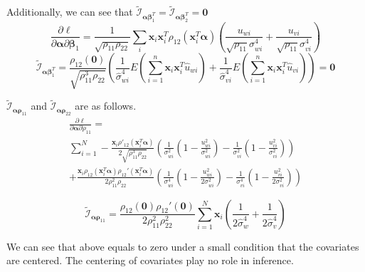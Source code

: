 \documentclass[aoas,preprint]{imsart}
\numberwithin{equation}{section}
\theoremstyle{plain}
\begin{document}
Additionally, we can see that $\tilde{\mathcal{I}}_{\bm{\alpha}{\bm{\beta}_1^T}} =  \tilde{\mathcal{I}}_{\bm{\alpha}{\bm{\beta}_2^T}} = \bm{0}$
\begin{equation}
\frac{\partial \ell}{\partial \bm{\alpha} \partial\bm{\beta}_1}= 
    \frac{1}{\sqrt{\rho_{11}\rho_{22}}} \sum_i \bm{x}_i \bm{x}_i^T \rho_{12}(\bm{x}_i^T \bm{\alpha}) \left( 
    \frac{u_{wi}}{\sqrt{\rho_{11}}\sigma_{wi}^4} + \frac{u_{vi}}{\sqrt{\rho_{11}}\sigma_{vi}^4}
    \right)
\end{equation}
$$
\tilde{\mathcal{I}}_{\bm{\alpha}{\bm{\beta}_1^T}} = 
\frac{\rho_{12}(\bm{0})}{\sqrt{\rho_{11}^3\rho_{22}}} \left(
\frac{1}{\hat{\sigma}_{wi}^4}
E\left( \sum_{i=1}^{n} \bm{x}_i \bm{x}_i^T \hat{u}_{wi}\right)
+\frac{1}{\hat{\sigma}_{vi}^4}
E\left( \sum_{i=1}^{n} \bm{x}_i \bm{x}_i^T \hat{u}_{vi} \right)
\right) = \bm{0}$$

\noindent $\tilde{\mathcal{I}}_{\bm{\alpha}\bm{\rho}_{11}}$ and $\tilde{\mathcal{I}}_{\bm{\alpha}\bm{\rho}_{22}}$ are as follows.
\begin{equation}
    \begin{multlined}
    \frac{\partial \ell}{\partial \bm{\alpha}\partial\rho_{11}} = \\
     \sum_{i=1}^{N} -\frac{\bm{x}_i \rho'_{12}(\bm{x}_i^T \bm{\alpha})}{2\sqrt{\rho_{11}^3\rho_{22}}} \left( \frac{1}{\sigma_{wi}^2}\left( 1-\frac{u_{wi}^2}{\sigma_{wi}^2} \right) - 
     \frac{1}{\sigma_{vi}^2} \left( 1-\frac{u_{vi}^2}{\sigma_{vi}^2}\right) \right)\\
     + \frac{\bm{x}_i \rho_{12}(\bm{x}_i^T \bm{\alpha}) \rho_{12}'(\bm{x}_i^T \bm{\alpha})}{2\rho_{11}^2 \rho_{22}}\left( \frac{1}{\sigma_{wi}^4}\left( 1-\frac{u_{wi}^2}{2\sigma_{wi}^2} \right) - 
     \frac{1}{\sigma_{vi}^4} \left( 1-\frac{u_{vi}^2}{2\sigma_{vi}^2}\right) \right)
    \end{multlined}
\end{equation}

\begin{equation*}
\tilde{\mathcal{I}}_{\bm{\alpha}\bm{\rho}_{11}} = \frac{\rho_{12}(\bm{0})\rho_{12}'(\bm{0})}{2\rho_{11}^2 \rho_{22}^2} \sum_{i=1}^{N} \bm{x}_i \left( \frac{1}{2\hat{\sigma}_w^4} + \frac{1}{2\hat{\sigma}_v^4}\right)
\end{equation*}

We can see that above equals to zero under a small condition that the covariates are centered. The centering of covariates play no role in inference. \\
\end{document}
